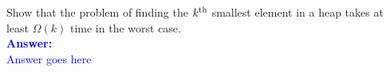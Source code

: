 \item{}
Show that the problem of finding the $k^{\rm th}$ smallest element in a heap
takes at least $\Omega(k)$ time in the worst case.\\[12pt]
\ifanswers
\textcolor{blue}{
\textbf{Answer:}\\[6pt]
Answer goes here
}
\newpage
\fi
